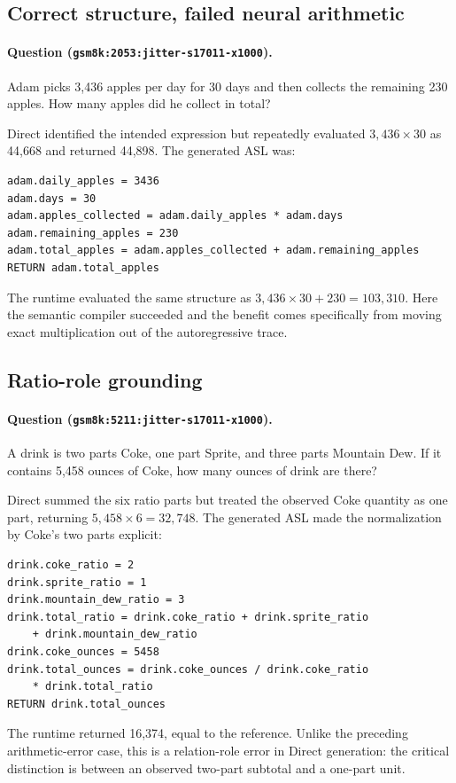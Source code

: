 \documentclass[11pt]{article}
\begin{document}
\subsection{Correct structure, failed neural arithmetic}

\paragraph{Question (\texttt{gsm8k:2053:jitter-s17011-x1000}).}
Adam picks 3,436 apples per day for 30 days and then collects the remaining 230
apples.  How many apples did he collect in total?

Direct identified the intended expression but repeatedly evaluated
$3{,}436\mathbin{\times}30$ as 44,668 and returned 44,898.  The generated ASL
was:
\begin{verbatim}
adam.daily_apples = 3436
adam.days = 30
adam.apples_collected = adam.daily_apples * adam.days
adam.remaining_apples = 230
adam.total_apples = adam.apples_collected + adam.remaining_apples
RETURN adam.total_apples
\end{verbatim}
The runtime evaluated the same structure as
$3{,}436\mathbin{\times}30+230=103{,}310$.  Here the semantic compiler succeeded
and the benefit comes specifically from moving exact multiplication out of the
autoregressive trace.

\subsection{Ratio-role grounding}

\paragraph{Question (\texttt{gsm8k:5211:jitter-s17011-x1000}).}
A drink is two parts Coke, one part Sprite, and three parts Mountain Dew.  If it
contains 5,458 ounces of Coke, how many ounces of drink are there?

Direct summed the six ratio parts but treated the observed Coke quantity as one
part, returning $5{,}458\mathbin{\times}6=32{,}748$.  The generated ASL made the
normalization by Coke's two parts explicit:
\begin{verbatim}
drink.coke_ratio = 2
drink.sprite_ratio = 1
drink.mountain_dew_ratio = 3
drink.total_ratio = drink.coke_ratio + drink.sprite_ratio
    + drink.mountain_dew_ratio
drink.coke_ounces = 5458
drink.total_ounces = drink.coke_ounces / drink.coke_ratio
    * drink.total_ratio
RETURN drink.total_ounces
\end{verbatim}
The runtime returned 16,374, equal to the reference.  Unlike the preceding
arithmetic-error case, this is a relation-role error in Direct generation: the
critical distinction is between an observed two-part subtotal and a one-part
unit.
\end{document}
